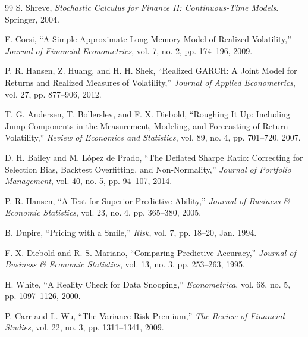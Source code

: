 \documentclass[journal]{IEEEtran}
\begin{document}
\begin{thebibliography}{99}
S. Shreve, \emph{Stochastic Calculus for Finance II: Continuous-Time Models}. Springer, 2004.

F. Corsi, ``A Simple Approximate Long-Memory Model of Realized Volatility,'' \emph{Journal of Financial Econometrics}, vol. 7, no. 2, pp. 174--196, 2009.

P. R. Hansen, Z. Huang, and H. H. Shek, ``Realized GARCH: A Joint Model for Returns and Realized Measures of Volatility,'' \emph{Journal of Applied Econometrics}, vol. 27, pp. 877--906, 2012.

T. G. Andersen, T. Bollerslev, and F. X. Diebold, ``Roughing It Up: Including Jump Components in the Measurement, Modeling, and Forecasting of Return Volatility,'' \emph{Review of Economics and Statistics}, vol. 89, no. 4, pp. 701--720, 2007.

D. H. Bailey and M. López de Prado, ``The Deflated Sharpe Ratio: Correcting for Selection Bias, Backtest Overfitting, and Non-Normality,'' \emph{Journal of Portfolio Management}, vol. 40, no. 5, pp. 94--107, 2014.

P. R. Hansen, ``A Test for Superior Predictive Ability,'' \emph{Journal of Business \& Economic Statistics}, vol. 23, no. 4, pp. 365--380, 2005.

B. Dupire, ``Pricing with a Smile,'' \emph{Risk}, vol. 7, pp. 18--20, Jan. 1994.

F. X. Diebold and R. S. Mariano, ``Comparing Predictive Accuracy,'' \emph{Journal of Business \& Economic Statistics}, vol. 13, no. 3, pp. 253--263, 1995.

H. White, ``A Reality Check for Data Snooping,'' \emph{Econometrica}, vol. 68, no. 5, pp. 1097--1126, 2000.

P. Carr and L. Wu, ``The Variance Risk Premium,'' \emph{The Review of Financial Studies}, vol. 22, no. 3, pp. 1311--1341, 2009.

\end{thebibliography}
\end{document}
